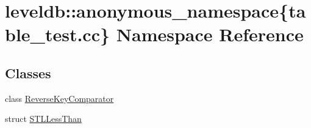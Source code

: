 \hypertarget{namespaceleveldb_1_1anonymous__namespace_02table__test_8cc_03}{}\section{leveldb\+:\+:anonymous\+\_\+namespace\{table\+\_\+test.\+cc\} Namespace Reference}
\label{namespaceleveldb_1_1anonymous__namespace_02table__test_8cc_03}
\subsection*{Classes}
\begin{DoxyCompactItemize}
\item 
class \hyperlink{classleveldb_1_1anonymous__namespace_02table__test_8cc_03_1_1_reverse_key_comparator}{Reverse\+Key\+Comparator}
\item 
struct \hyperlink{structleveldb_1_1anonymous__namespace_02table__test_8cc_03_1_1_s_t_l_less_than}{S\+T\+L\+Less\+Than}
\end{DoxyCompactItemize}
